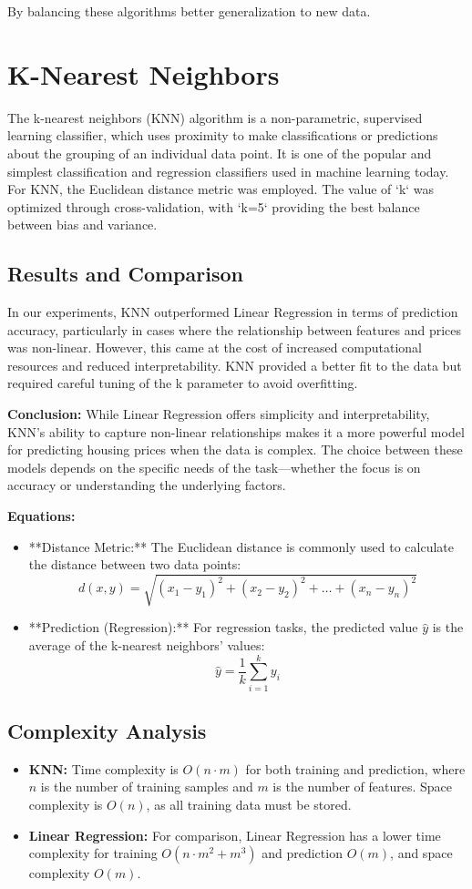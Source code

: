 \documentclass[10pt,conference,compsoc]{IEEEtran}
\begin{document}
{By balancing these algorithms better generalization to new data.

\section{K-Nearest Neighbors}
The k-nearest neighbors (KNN) algorithm is a non-parametric, supervised learning classifier, which uses proximity to make classifications or predictions about the grouping of an individual data point. It is one of the popular and simplest classification and regression classifiers used in machine learning today.
For KNN, the Euclidean distance metric was employed. The value of `k` was optimized through cross-validation, with `k=5` providing the best balance between bias and variance.
\subsection{Results and Comparison}
In our experiments, KNN outperformed Linear Regression in terms of prediction accuracy, particularly in cases where the relationship between features and prices was non-linear. However, this came at the cost of increased computational resources and reduced interpretability. KNN provided a better fit to the data but required careful tuning of the
k parameter to avoid overfitting.

\textbf{Conclusion:} While Linear Regression offers simplicity and interpretability, KNN's ability to capture non-linear relationships makes it a more powerful model for predicting housing prices when the data is complex. The choice between these models depends on the specific needs of the task—whether the focus is on accuracy or understanding the underlying factors.


\textbf{Equations:}
\begin{itemize}
    \item **Distance Metric:** The Euclidean distance is commonly used to calculate the distance between two data points:
    \[
    d(x, y) = \sqrt{(x_1 - y_1)^2 + (x_2 - y_2)^2 + \ldots + (x_n - y_n)^2}
    \]
    \item **Prediction (Regression):** For regression tasks, the predicted value \( \hat{y} \) is the average of the k-nearest neighbors' values:
    \[
    \hat{y} = \frac{1}{k} \sum_{i=1}^{k} y_i
    \]
\end{itemize}

\subsection{Complexity Analysis}
\begin{itemize}
    \item \textbf{KNN:} Time complexity is \( O(n \cdot m) \) for both training and prediction, where \( n \) is the number of training samples and \( m \) is the number of features. Space complexity is \( O(n) \), as all training data must be stored.
    \item \textbf{Linear Regression:} For comparison, Linear Regression has a lower time complexity for training \( O(n \cdot m^2 + m^3) \) and prediction \( O(m) \), and space complexity \( O(m) \).
\end{itemize}

}
\end{document}
